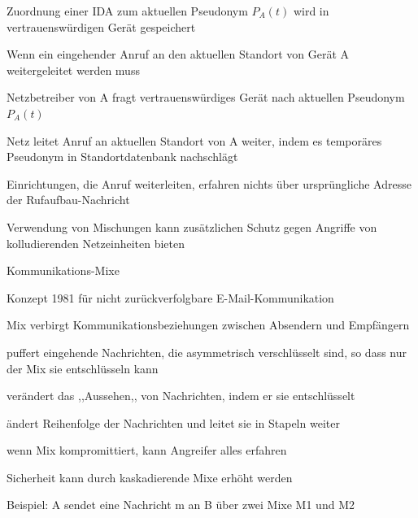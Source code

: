 \documentclass[a4paper]{article}
\begin{document}
\begin{multicols}{3}
\begin{itemize*}
\begin{itemize*}
                  \item Zuordnung einer IDA zum aktuellen Pseudonym $P_A(t)$ wird in vertrauenswürdigen Gerät gespeichert
                  \item Wenn ein eingehender Anruf an den aktuellen Standort von Gerät A weitergeleitet werden muss
                  \begin{itemize*}
                        \item Netzbetreiber von A fragt vertrauenswürdiges Gerät nach aktuellen Pseudonym $P_A(t)$
                        \item Netz leitet Anruf an aktuellen Standort von A weiter, indem es temporäres Pseudonym in Standortdatenbank nachschlägt
                  \end{itemize*}
                  \item Einrichtungen, die Anruf weiterleiten, erfahren nichts über ursprüngliche Adresse der Rufaufbau-Nachricht %
                  \item Verwendung von Mischungen kann zusätzlichen Schutz gegen Angriffe von kolludierenden Netzeinheiten bieten
            \end{itemize*}
            \item Kommunikations-Mixe
            \begin{itemize*}
                  \item Konzept 1981 für nicht zurückverfolgbare E-Mail-Kommunikation
                  \item Mix verbirgt Kommunikationsbeziehungen zwischen Absendern und Empfängern
                  \item puffert eingehende Nachrichten, die asymmetrisch verschlüsselt sind, so dass nur der Mix sie entschlüsseln kann
                  \item verändert das ,,Aussehen,, von Nachrichten, indem er sie entschlüsselt
                  \item ändert Reihenfolge der Nachrichten und leitet sie in Stapeln weiter
                  \item wenn Mix kompromittiert, kann Angreifer alles erfahren
                  \item Sicherheit kann durch kaskadierende Mixe erhöht werden
                  \item Beispiel: A sendet eine Nachricht m an B über zwei Mixe M1 und M2

\end{itemize*}
\end{itemize*}
\end{multicols}
\end{document}
